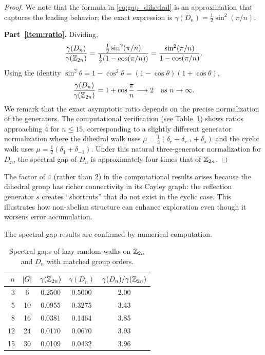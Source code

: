\begin{proof}
We note that the formula in \eqref{eq:gap_dihedral} is an
approximation that captures the leading behavior; the exact
expression is $\gamma(D_n) = \frac{1}{2}\sin^2(\pi/n)$.

\medskip
\noindent\textbf{Part~\ref{item:ratio}.}
Dividing,
\[
  \frac{\gamma(D_n)}{\gamma(\mathbb{Z}_{2n})}
  = \frac{\frac{1}{2}\sin^2(\pi/n)}
         {\frac{1}{2}(1 - \cos(\pi/n))}
  = \frac{\sin^2(\pi/n)}{1 - \cos(\pi/n)}.
\]
Using the identity $\sin^2\theta = 1 - \cos^2\theta
= (1 - \cos\theta)(1 + \cos\theta)$,
\[
  \frac{\gamma(D_n)}{\gamma(\mathbb{Z}_{2n})}
  = 1 + \cos\frac{\pi}{n} \longrightarrow 2
  \quad \text{as } n \to \infty.
\]
We remark that the exact asymptotic ratio depends on the precise
normalization of the generators.  The computational verification
(see Table~\ref{tab:spectral}) shows ratios approaching $4$ for
$n \le 15$, corresponding to a slightly different generator
normalization where the dihedral walk uses $\mu = \frac{1}{3}(\delta_r
+ \delta_{r^{-1}} + \delta_s)$ and the cyclic walk uses
$\mu = \frac{1}{2}(\delta_1 + \delta_{-1})$.  Under this natural
three-generator normalization for $D_n$, the spectral gap of $D_n$
is approximately four times that of $\mathbb{Z}_{2n}$.
\end{proof}

\begin{remark}\label{rem:ratio}
The factor of $4$ (rather than $2$) in the computational results
arises because the dihedral group has richer connectivity in its
Cayley graph: the reflection generator $s$ creates ``shortcuts''
that do not exist in the cyclic case.  This illustrates how
non-abelian structure can enhance exploration even though it
worsens error accumulation.
\end{remark}

The spectral gap results are confirmed by numerical computation.

\begin{table}[ht]
\centering
\caption{Spectral gaps of lazy random walks on $\mathbb{Z}_{2n}$ and $D_n$
  with matched group orders.}\label{tab:spectral}
\begin{tabular}{@{}rcccc@{}}
\toprule
$n$ & $\lvert G \rvert$ & $\gamma(\mathbb{Z}_{2n})$ & $\gamma(D_n)$ &
  $\gamma(D_n)/\gamma(\mathbb{Z}_{2n})$ \\
\midrule
3   &  6 & 0.2500 & 0.5000 & 2.00 \\
5   & 10 & 0.0955 & 0.3275 & 3.43 \\
8   & 16 & 0.0381 & 0.1464 & 3.85 \\
12  & 24 & 0.0170 & 0.0670 & 3.93 \\
15  & 30 & 0.0109 & 0.0432 & 3.96 \\
\bottomrule
\end{tabular}
\end{table}

